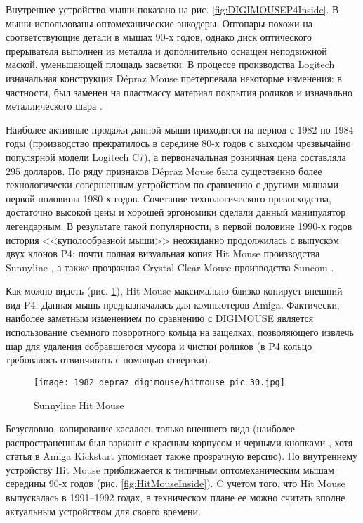 \documentclass[11pt, a4paper]{article}
\begin{document}
Внутреннее устройство мыши показано на рис. \ref{fig:DIGIMOUSEP4Inside}. В мыши использованы оптомеханические энкодеры. Оптопары похожи на соответствующие детали в мышах 90-х годов, однако диск оптического прерывателя выполнен из металла и дополнительно оснащен неподвижной маской, уменьшающей площадь засветки. В процессе производства Logitech изначальная конструкция Dépraz Mouse претерпевала некоторые изменения: в частности, был заменен на пластмассу материал покрытия роликов и изначально металлического шара \cite{oldmouse}.

Наиболее активные продажи данной мыши приходятся на период с 1982 по 1984 годы (производство прекратилось в середине 80-х годов с выходом чрезвычайно популярной модели Logitech C7), а первоначальная розничная цена составляла 295 долларов. По ряду признаков Dépraz Mouse была существенно более технологически-совершенным устройством по сравнению с другими мышами первой половины 1980-х годов. Сочетание технологического превосходства, достаточно высокой цены и хорошей эргономики сделали данный манипулятор легендарным. В результате такой популярности, в первой половине 1990-х годов история <<куполообразной мыши>> неожиданно продолжилась с выпуском двух клонов P4: почти полная визуальная копия Hit Mouse производства Sunnyline \cite{sunnyline}, а также прозрачная Crystal Clear Mouse производства Suncom \cite{suncom}.

Как можно видеть (рис. \ref{fig:HitMousePic}), Hit Mouse максимально близко копирует внешний вид P4. Данная мышь предназначалась для компьютеров Amiga. Фактически, наиболее заметным изменением по сравнению с DIGIMOUSE является использование съемного поворотного кольца на защелках, позволяющего извлечь шар для удаления собравшегося мусора и чистки роликов (в P4 кольцо требовалось отвинчивать с помощью отвертки).

\begin{figure}[h]
   \centering
    \texttt{[image: 1982\_depraz\_digimouse/hitmouse\_pic\_30.jpg]}
    \caption{Sunnyline Hit Mouse}
    \label{fig:HitMousePic}
\end{figure}

Безусловно, копирование касалось только внешнего вида (наиболее распространенным был вариант с красным корпусом и черными кнопками \cite{sunnyline, sunnylineDOS}, хотя статья в Amiga Kickstart упоминает также прозрачную версию). По внутреннему устройству Hit Mouse приближается к типичным оптомеханическим мышам середины 90-х годов (рис. \ref{fig:HitMouseInside}). C учетом того, что Hit Mouse выпускалась в 1991--1992 годах, в техническом плане ее можно считать вполне актуальным устройством для своего времени.
\end{document}
